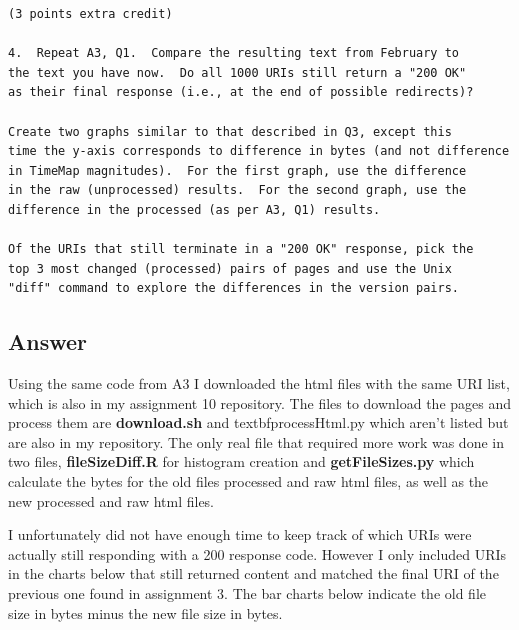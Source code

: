 \documentclass[letterpaper,11pt]{article}
\begin{document}
\begin{verbatim}
(3 points extra credit)

4.  Repeat A3, Q1.  Compare the resulting text from February to 
the text you have now.  Do all 1000 URIs still return a "200 OK" 
as their final response (i.e., at the end of possible redirects)?

Create two graphs similar to that described in Q3, except this 
time the y-axis corresponds to difference in bytes (and not difference
in TimeMap magnitudes).  For the first graph, use the difference
in the raw (unprocessed) results.  For the second graph, use the 
difference in the processed (as per A3, Q1) results.

Of the URIs that still terminate in a "200 OK" response, pick the
top 3 most changed (processed) pairs of pages and use the Unix
"diff" command to explore the differences in the version pairs.
\end{verbatim}

\subsection*{Answer}

Using the same code from A3 I downloaded the html files with the same URI list, which is also in my assignment 10 repository. The files to download the pages and process them are \textbf{download.sh} and textbf{processHtml.py} which aren't listed but are also in my repository. The only real file that required more work was done in two files, \textbf{fileSizeDiff.R} for histogram creation and \textbf{getFileSizes.py} which calculate the bytes for the old files processed and raw html files, as well as the new processed and raw html files.

I unfortunately did not have enough time to keep track of which URIs were actually still responding with a 200 response code. However I only included URIs in the charts below that still returned content and matched the final URI of the previous one found in assignment 3. The bar charts below indicate the old file size in bytes minus the new file size in bytes.
\end{document}
